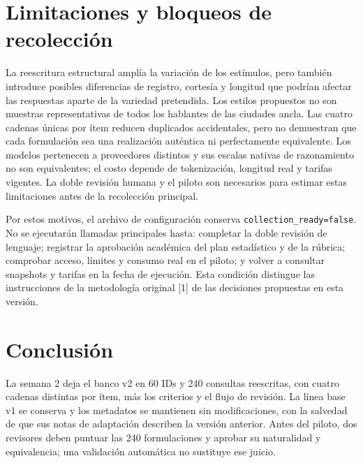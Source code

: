 \documentclass[conference]{IEEEtran}
\begin{document}
\section{Limitaciones y bloqueos de recolección}
La reescritura estructural amplía la variación de los estímulos, pero también introduce posibles diferencias de registro, cortesía y longitud que podrían afectar las respuestas aparte de la variedad pretendida. Los estilos propuestos no son muestras representativas de todos los hablantes de las ciudades ancla. Las cuatro cadenas únicas por ítem reducen duplicados accidentales, pero no demuestran que cada formulación sea una realización auténtica ni perfectamente equivalente. Los modelos pertenecen a proveedores distintos y sus escalas nativas de razonamiento no son equivalentes; el costo depende de tokenización, longitud real y tarifas vigentes. La doble revisión humana y el piloto son necesarios para estimar estas limitaciones antes de la recolección principal.

Por estos motivos, el archivo de configuración conserva \texttt{collection\_ready=false}. No se ejecutarán llamadas principales hasta: completar la doble revisión de lenguaje; registrar la aprobación académica del plan estadístico y de la rúbrica; comprobar acceso, límites y consumo real en el piloto; y volver a consultar snapshots y tarifas en la fecha de ejecución. Esta condición distingue las instrucciones de la metodología original [1] de las decisiones propuestas en esta versión.

\section{Conclusión}
La semana 2 deja el banco v2 en 60 IDs y 240 consultas reescritas, con cuatro cadenas distintas por ítem, más los criterios y el flujo de revisión. La línea base v1 se conserva y los metadatos se mantienen sin modificaciones, con la salvedad de que sus notas de adaptación describen la versión anterior. Antes del piloto, dos revisores deben puntuar las 240 formulaciones y aprobar su naturalidad y equivalencia; una validación automática no sustituye ese juicio.
\end{document}
